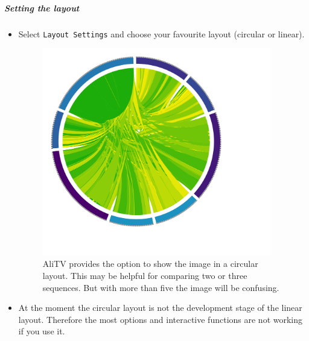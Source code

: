 \documentclass[a4paper]{scrartcl}
\begin{document}
\subparagraph*{Setting the layout}
\begin{itemize}
	\item Select \texttt{Layout Settings} and choose your favourite layout (circular or linear).
	\begin{figure}[H]
		\centering
		\includegraphics[width=10cm]{circular.png}
		\caption{AliTV provides the option to show the image in a circular layout. This may be helpful for comparing two or three sequences. But with more than five the image will be confusing.}
	\end{figure}
	 \item At the moment the circular layout is not the development stage of the linear layout. Therefore the most options and interactive functions are not working if you use it.
\end{itemize}
\end{document}
